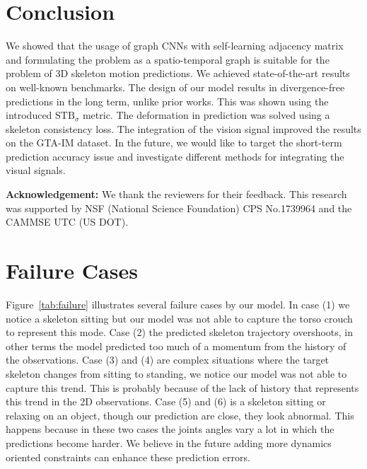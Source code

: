 \documentclass[10pt,twocolumn,letterpaper]{article}
\begin{document}
\section{Conclusion}
We showed that the usage of graph CNNs with self-learning adjacency matrix and formulating the problem as a spatio-temporal graph is suitable for the problem of 3D skeleton motion predictions. We achieved state-of-the-art results on well-known benchmarks. The design of our model results in divergence-free predictions in the long term, unlike prior works. This was shown using the introduced $\text{STB}_\sigma$ metric. The deformation in prediction was solved using a skeleton consistency loss. The integration of the vision signal improved the results on the GTA-IM dataset. In the future, we would like to target the short-term prediction accuracy issue and investigate different methods for integrating the visual signals.

\textbf{Acknowledgement:} We thank the reviewers for their feedback. This research was supported by NSF (National Science Foundation) CPS No.1739964 and the CAMMSE UTC (US DOT).
\clearpage
{\small


}
\clearpage
\appendix

\section{Failure Cases}

Figure~\ref{tab:failure} illustrates several failure cases by our model. In case (1) we notice a skeleton sitting but our model was not able to capture the torso crouch to represent this mode. Case (2) the predicted skeleton trajectory overshoots, in other terms the model predicted too much of a momentum from the history of the observations. Case (3) and (4) are complex situations where the target skeleton changes from sitting to standing, we notice our model was not able to capture this trend. This is probably because of the lack of history that represents this trend in the 2D observations. Case (5) and (6) is a skeleton sitting or relaxing on an object, though our prediction are close, they look abnormal. This happens because in these two cases the joints angles vary a lot in which the predictions become harder. We believe in the future adding more dynamics oriented constraints can enhance these prediction errors.
\end{document}
